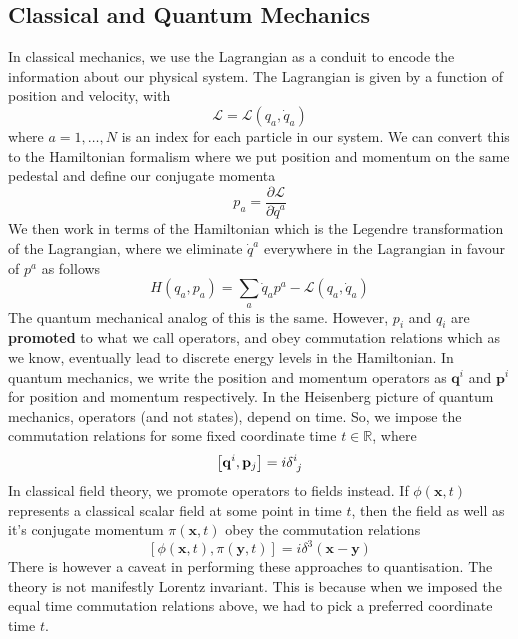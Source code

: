 \documentclass[11pt, oneside]{article}   	%
\theoremstyle{slanted}
\let\vec\mathbf
\begin{document}
\subsection{Classical and Quantum Mechanics}
In classical mechanics, we use the Lagrangian 
as a conduit to encode the information about our 
physical system. The Lagrangian is given by a function 
of position and velocity, with 
\[
	\mathcal{ L }  = \mathcal{ L } \left( q _ a , \dot {q} _ a  \right) 
\] where $ a = 1 , \dots  , N $ is an index for each particle 
in our system. We can convert this to the Hamiltonian formalism 
where we put position and momentum on the same pedestal and 
define our conjugate momenta
\[
 p _ a = \frac{\partial  \mathcal{ L }}{\partial  \dot{q } ^ a  } 
\] We then work in terms of the Hamiltonian 
which is the Legendre transformation of the 
Lagrangian, where we eliminate $ \dot{ q }^ a   $
everywhere in the Lagrangian in favour of $ p^ a$ as follows 
\[
	H ( q_a , p _ a  ) = \sum _{ a } \dot{ q }_ a p ^ a  - \mathcal{ L } \left( q _ a , \dot{ q } _ a  \right)   
\] 
The quantum mechanical analog of this is the same. 
However, $ p_ i $ and $ q _ i $ are \textbf{promoted} to 
what we call operators, and obey commutation relations 
which as we know, eventually lead to discrete energy levels 
in the Hamiltonian. In quantum mechanics,
we write the position and momentum operators 
as $ \vec{q}^ i  $ and $ \vec{p} ^ i $ for position  
and momentum respectively. 
In the Heisenberg picture of quantum mechanics, 
operators (and not states), depend on time. 
So, we impose the commutation relations 
for some fixed coordinate time $ t \in \mathbb{ R } $, where 
\[
 \left[  \vec{q}^ i , \vec{p} _ j  \right]   = i  \delta \indices{ ^ i _ j }  
\]  
In classical field theory, we 
promote operators 
to fields instead. If $ \phi ( \vec{x} , t ) $  
represents a classical scalar field at some point in time $ t $, 
then the field as well as it's conjugate momentum $ \pi \left( \vec{x}, t   \right) $ 
obey the commutation relations
\[
	\left[  \phi ( \vec{x},  t ) , \pi ( \vec{y}, t  )  \right]  
	= i \delta ^ 3 \left( \vec{x} - \vec{y} \right) 
\] There is however a caveat in performing these 
approaches to quantisation. 
The theory is not manifestly Lorentz invariant. This is because 
when we imposed the equal time commutation 
relations above, we had to pick a preferred coordinate 
time $ t $. 
\end{document}

